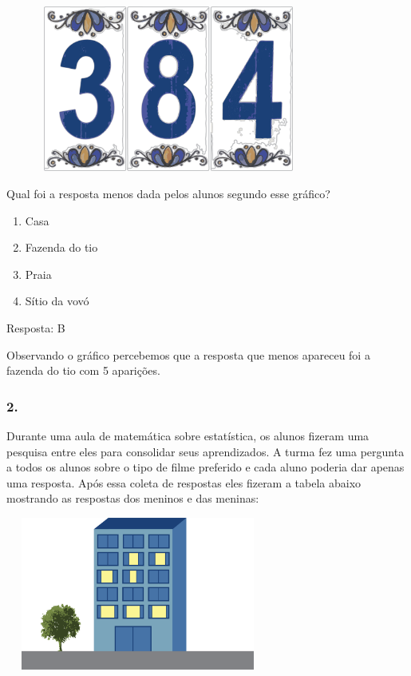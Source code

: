 \includegraphics[width=4.23077in,height=2.15071in]{media/image92.png}

Qual foi a resposta menos dada pelos alunos segundo esse gráfico?

\begin{enumerate}
\def\labelenumi{\alph{enumi})}
\item
  Casa
\item
  Fazenda do tio
\item
  Praia
\item
  Sítio da vovó
\end{enumerate}

Resposta: B

Observando o gráfico percebemos que a resposta que menos apareceu foi a
fazenda do tio com 5 aparições.

\subsubsection{2.}\label{section-109}

Durante uma aula de matemática sobre estatística, os alunos fizeram uma
pesquisa entre eles para consolidar seus aprendizados. A turma fez uma
pergunta a todos os alunos sobre o tipo de filme preferido e cada aluno
poderia dar apenas uma resposta. Após essa coleta de respostas eles
fizeram a tabela abaixo mostrando as respostas dos meninos e das
meninas:

\includegraphics[width=3.42308in,height=1.97646in]{media/image93.png}

